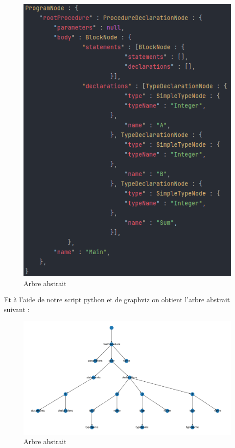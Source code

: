 \documentclass[french,a4paper]{article}
\begin{document}
    \begin{figure}[H]
        \centering
        \includegraphics[width=1\textwidth]{arbre_json}
        \caption{Arbre abstrait}\label{fig:figure5}
    \end{figure}

    Et à l'aide de notre script python et de graphviz on obtient l'arbre abstrait suivant :

    \begin{figure}[H]
        \centering
        \includegraphics[width=1\textwidth]{arbre_draw}
        \caption{Arbre abstrait}\label{fig:figure6}
    \end{figure}
\end{document}
